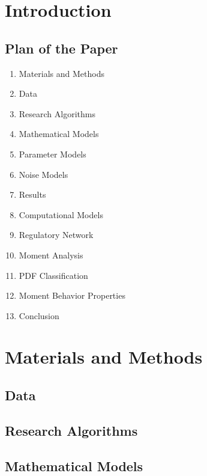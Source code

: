 

\section{Introduction}

\subsection{Plan of the Paper}
\begin{enumerate}
	\item Materials and Methods
	\item Data
	\item Research Algorithms
	\item Mathematical Models
	\item Parameter Models
	\item Noise Models
	\item Results
	\item Computational Models
	\item Regulatory Network
	\item Moment Analysis
	\item PDF Classification
	\item Moment Behavior Properties
	\item Conclusion
\end{enumerate}
\section{Materials and Methods}

\subsection{Data}

\subsection{Research Algorithms}

\subsection{Mathematical Models}

